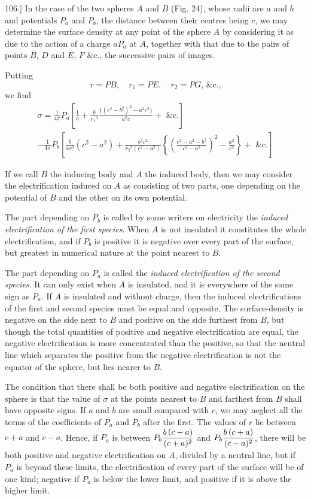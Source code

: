 \documentclass[12pt,oneside]{book}[2021/10/04]
\newcommand{\article}[1]{\phantomsection \label{art:#1}{#1.]}}
\newcommand{\xbp}{\rule[-2.4ex]{0pt}{5.6ex}}
\newcommand{\¬}{\hphantom{0}}
\begin{document}
\article{106} In the case of the two spheres \(A\) and \(B\) (Fig. 24), whose
radii are \(a\) and \(b\) and potentials \(P_a\) and \(P_b\), the distance between
their centres being \(c\), we may determine the surface density at any
point of the sphere \(A\) by considering it as due to the action of a
charge \(aP_a\) at \(A\), together with that due to the pairs of points \(B\),
\(D\) and \(E\), \(F\) \&c., the successive pairs of images.

Putting
\[
r = PB, \quad r_1 = PE, \quad r_2 = PG\text{, \&c.,}
\]
we find
\begin{multline*}
  \sigma = \frac{1}{4\pi} P_a \left[ \frac{1}{a} + \frac{b}{{r_1}^3} \frac{\{(c^2-b^2)^2-a^2c^2\}}{a^2c} + \text{ \&c.}\right]\\
  - \frac{1}{4\pi} P_b \left[ \frac{b}{ar^3} (c^2 - a^2) + \frac{b^2c^2}{{r_2}^3(c^2-a^2)} \left\{\left(\frac{c^2-a^2-b^2}{c^2-a^2} \right)^2 - \frac{a^2}{c^2}\right\} + \text{ \&c.}\right]
\end{multline*}

If we call \(B\) the inducing body and \(A\) the induced body, then we
may consider the electrification induced on \(A\) as consisting of two
parts, one depending on the potential of \(B\) and the other on its
own potential.

The part depending on \(P_b\) is called by some writers on electricity
the \textit{induced electrification of the first species}. When \(A\) is not insulated
it constitutes the whole electrification, and if \(P_b\) is positive
it is negative over every part of the surface, but greatest in
numerical nature at the point nearest to \(B\).

The part depending on \(P_a\) is called the \textit{induced electrification of
the second species}. It can only exist when \(A\) is insulated, and it
is everywhere of the same sign as \(P_a\). If \(A\) is insulated and without
charge, then the induced electrifications of the first and second
species must be equal and opposite. The surface-density is negative
on the side next to \(B\) and positive on the side furthest from \(B\), but
though the total quantities of positive and negative electrification
are equal, the negative electrification is more concentrated than the
positive, so that the neutral line which separates the positive from
the negative electrification is not the equator of the sphere, but lies
nearer to \(B\).

The condition that there shall be both positive and negative electrification
on the sphere is that the value of \(\sigma\) at the points nearest
to \(B\) and farthest from \(B\) shall have opposite signs. If \(a\) and \(b\) are
small compared with \(c\), we may neglect all the terms of the coefficients
of \(P_a\) and \(P_b\) after the first. The values of \(r\) lie between
\(c+a\) and \(c-a\). Hence, if \(P_a\) is between \(P_b \xbp\dfrac{b\,(c-a)}{(c+a)^2}\) and \(P_b\xbp\dfrac{b\,(c+a)}{(c-a)^2}\),
there will be both positive and negative electrification on \(A\), divided
by a neutral line, but if \(P_a\) is beyond these limits, the electrification
of every part of the surface will be of one kind; negative if \(P_a\) is
below the lower limit, and positive if it is above the higher limit.
\end{document}

